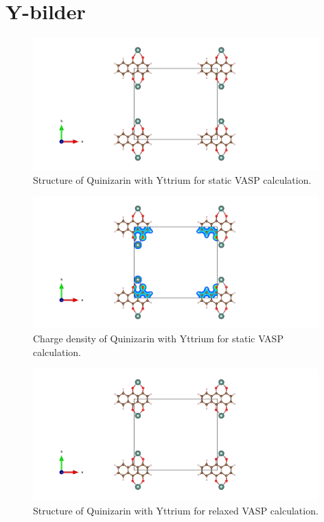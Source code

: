 \documentclass{article}
\begin{document}
\vspace{1cm}

\section{Y-bilder}

  \begin{figure}[H]
      \centering
      \includegraphics[width = 11cm]{../fig/Y_staticbefore_CONTCAR.png}
      \caption{Structure of Quinizarin with Yttrium for static VASP calculation. }
      \label{fig:Y_staticbefore_CONTCAR}
  \end{figure}

  \begin{figure}[H]
      \centering
      \includegraphics[width = 11cm]{../fig/Y_staticbefore_CHGCAR.png}
      \caption{Charge density of Quinizarin with Yttrium for static VASP calculation. }
      \label{fig:Y_staticbefore_CHGCAR}
  \end{figure}

  \begin{figure}[H]
      \centering
      \includegraphics[width = 11cm]{../fig/Y_relax_CONTCAR.png}
      \caption{Structure of Quinizarin with Yttrium for relaxed VASP calculation. }
      \label{fig:Y_relax_CONTCAR}
  \end{figure}
\end{document}
